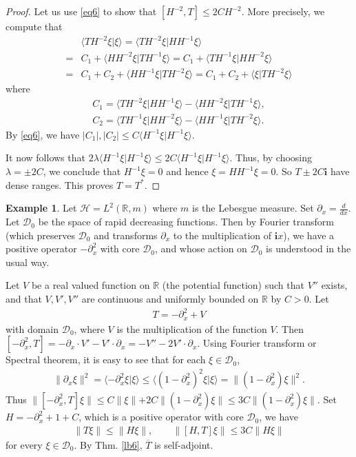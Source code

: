 \documentclass[12pt,a4paper,notitlepage]{article}
\theoremstyle{definition}
\newtheorem{eg}[df]{Example}
\theoremstyle{plain}
\newcommand{\mc}{\mathcal}
\newcommand{\ovl}{\overline}
\newcommand{\Dom}{\scr D}
\newcommand{\bk}[1]{\langle {#1}\rangle}
\newcommand{\scr}{\mathscr}
\newcommand{\im}{\mathbf{i}}
\newcommand{\Rbb}{\mathbb R}
\numberwithin{equation}{subsection}
\begin{document}
\begin{proof}
Let us use \eqref{eq6} to show that $[H^{-2},T]\leq 2CH^{-2}$. More precisely, we compute that
\begin{align}
&\bk{TH^{-2}\xi|\xi}=\bk{TH^{-2}\xi|HH^{-1}\xi}\\
=&C_1+\bk{HH^{-2}\xi|TH^{-1}\xi} =C_1+\bk{TH^{-1}\xi|HH^{-2}\xi}\\
=&C_1+C_2+\bk{HH^{-1}\xi|TH^{-2}\xi}=	C_1+C_2+\bk{\xi|TH^{-2}\xi}\label{eq8}
\end{align}
where
\begin{gather*}
C_1=\bk{TH^{-2}\xi|HH^{-1}\xi}-\bk{HH^{-2}\xi|TH^{-1}\xi},\\
C_2=\bk{TH^{-1}\xi|HH^{-2}\xi}-\bk{HH^{-1}\xi|TH^{-2}\xi}.
\end{gather*}
By \eqref{eq6}, we have $|C_1|,|C_2|\leq C\bk{H^{-1}\xi|H^{-1}\xi}$.

It now follows that $2\lambda\bk{H^{-1}\xi|H^{-1}\xi}\leq 2C\bk{H^{-1}\xi|H^{-1}\xi}$. Thus, by choosing $\lambda=\pm 2C$, we conclude that $H^{-1}\xi=0$ and hence $\xi=HH^{-1}\xi=0$. So $T\pm 2C\im$ have dense ranges. This proves $T=T^*$.
\end{proof}



\begin{eg}
Let $\mc H=L^2(\Rbb,m)$ where $m$ is the Lebesgue measure. Set $\partial_x=\frac d{dx}$. Let $\Dom_0$ be the space of rapid decreasing functions. Then by Fourier transform (which preserves $\Dom_0$ and transforms $\partial_x$ to the multiplication of $\im x$), we have a positive operator $-\partial_x^2$ with core $\Dom_0$, and whose action on $\Dom_0$ is understood in the usual way.

Let $V$ be a real valued function on $\Rbb$ (the potential function) such that $V''$ exists, and that $V,V',V''$ are continuous and  uniformly bounded on $\Rbb$ by $C>0$. Let
\begin{align*}
T=-\partial_x^2+V	
\end{align*}
with domain $\Dom_0$, where $V$ is the multiplication of the function $V$. Then $[-\partial_x^2,T]=-\partial_x\cdot V'-V'\cdot \partial_x=-V''-2V'\cdot\partial_x$. Using Fourier transform or Spectral theorem, it is easy to see that for each $\xi\in\Dom_0$,
\begin{align*}
\lVert \partial_x\xi\lVert^2=\bk{-\partial_x^2\xi|\xi}\leq 	\bk{(1-\partial_x^2)^2\xi|\xi}=\lVert (1-\partial_x^2)\xi\lVert^2.
\end{align*}
Thus $\lVert[-\partial_x^2,T]\xi\lVert\leq C\lVert \xi\lVert+2C\lVert (1-\partial_x^2)\xi\lVert\leq 3C\lVert (1-\partial_x^2)\xi\lVert$. Set $H=-\partial_x^2+1+C$, which is a positive operator with core $\Dom_0$, we have
\begin{align*}
\lVert T\xi\lVert\leq \lVert H\xi\lVert,\qquad \lVert [H,T]\xi\lVert \leq 3C\lVert H\xi\lVert	
\end{align*}
for every $\xi\in\Dom_0$. By Thm. \ref{lb6}, $\ovl T$ is self-adjoint.
\end{eg}
\end{document}
